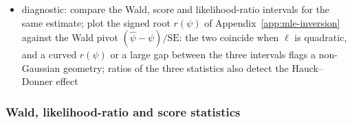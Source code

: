 \begin{itemize}
\begin{itemize}
          unbalanced composition or overlapping types, the profile is skewed and the plateau is wide; the
          ILR slices of the covariance-driven scenario show these ridges
          ()
  \end{itemize}
  \item diagnostic: compare the Wald, score and likelihood-ratio intervals for the same estimate; plot
        the signed root \(r(\psi)\) of Appendix~\ref{app:mle-inversion} against the Wald pivot
        \((\hat\psi-\psi)/\mathrm{SE}\): the two coincide when \(\ell\) is quadratic, and a curved \(r(\psi)\) or a
        large gap between the three intervals flags a non-Gaussian geometry; ratios of the three
        statistics also detect the Hauck--Donner effect \cite{yeeHauckDonnerEffectWald2022}
\end{itemize}

\subsubsection{Wald, likelihood-ratio and score statistics}
\label{app:mle-tests}
\label{app:mle-intervals}

